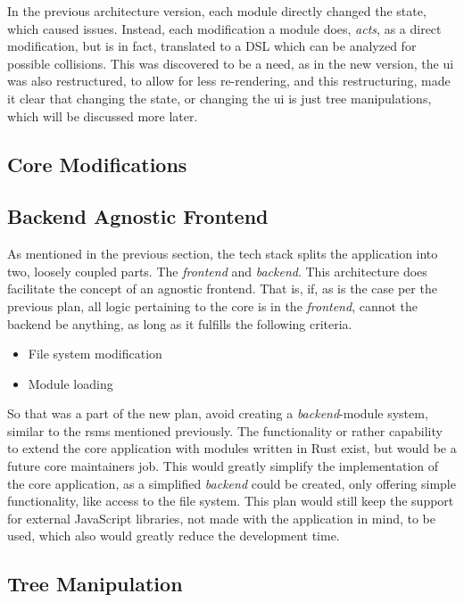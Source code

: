 In the previous architecture version, each module directly changed the state,
which caused issues. Instead, each modification a module does, \textit{acts}, as
a direct modification, but is in fact, translated to a DSL which can be analyzed
for possible collisions. This was discovered to be a need, as in the new
version, the \gls{ui} was also restructured, to allow for less re-rendering, and
this restructuring, made it clear that changing the state, or changing the
\gls{ui} is just tree manipulations, which will be discussed more later.

\subsection{Core Modifications}



\subsection{Backend Agnostic Frontend}

As mentioned in the previous section, the tech stack splits the application into
two, loosely coupled parts. The \textit{frontend} and \textit{backend}. This
architecture does facilitate the concept of an agnostic frontend. That is, if,
as is the case per the previous plan, all logic pertaining to the core is in the
\textit{frontend}, cannot the backend be anything, as long as it fulfills the
following criteria.

\begin{itemize}
  \item File system modification
  \item Module loading
\end{itemize}

So that was a part of the new plan, avoid creating a \textit{backend}-module
system, similar to the \gls{rsms} mentioned previously. The functionality or
rather capability to extend the core application with modules written in Rust
exist, but would be a future core maintainers job. This would greatly simplify
the implementation of the core application, as a simplified \textit{backend}
could be created, only offering simple functionality, like access to the file
system. This plan would still keep the support for external JavaScript
libraries, not made with the application in mind, to be used, which also would
greatly reduce the development time.

\subsection{Tree Manipulation}

